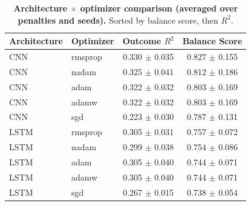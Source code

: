 \begin{table}[ht]
\centering
\caption{\textbf{Architecture $\times$ optimizer comparison (averaged over penalties and seeds).}
Sorted by balance score, then $R^2$.}
\label{tab:arch_optimizer_summary}
\begin{tabular}{llcc}
\toprule
Architecture & Optimizer & Outcome $R^2$ & Balance Score \\
\midrule
CNN & rmsprop & 0.330 $\pm$ 0.035 & 0.827 $\pm$ 0.155 \\
CNN & nadam & 0.325 $\pm$ 0.041 & 0.812 $\pm$ 0.186 \\
CNN & adam & 0.322 $\pm$ 0.032 & 0.803 $\pm$ 0.169 \\
CNN & adamw & 0.322 $\pm$ 0.032 & 0.803 $\pm$ 0.169 \\
CNN & sgd & 0.223 $\pm$ 0.030 & 0.787 $\pm$ 0.131 \\
LSTM & rmsprop & 0.305 $\pm$ 0.031 & 0.757 $\pm$ 0.072 \\
LSTM & nadam & 0.299 $\pm$ 0.038 & 0.754 $\pm$ 0.086 \\
LSTM & adam & 0.305 $\pm$ 0.040 & 0.744 $\pm$ 0.071 \\
LSTM & adamw & 0.305 $\pm$ 0.040 & 0.744 $\pm$ 0.071 \\
LSTM & sgd & 0.267 $\pm$ 0.015 & 0.738 $\pm$ 0.054 \\
\bottomrule
\end{tabular}
\end{table}
